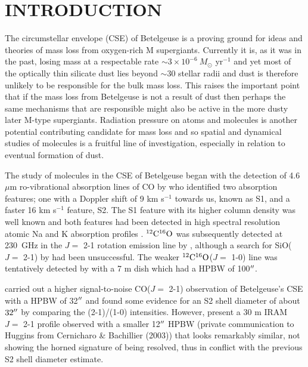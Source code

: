 \documentclass[preprint2]{aastex}
\begin{document}

\section{INTRODUCTION}

The circumstellar envelope (CSE) of Betelgeuse is a proving ground for ideas and theories of mass loss from oxygen-rich M supergiants. Currently it is, as it was in the past, losing mass at a respectable rate $\sim 3\times 10^{-6} \ M{}_{\odot}$ yr${}^{-1}$\citep{1986ApJ...306..605G, 1994ApJ...424L.127H,harper_2001} and yet most of the optically thin silicate dust lies beyond $\sim 30$ stellar radii \citep{1994AJ....107.1469D} and dust is therefore unlikely to be responsible for the bulk mass loss. This raises the important point that if the mass loss from Betelgeuse is not a result of dust then perhaps the same mechanisms that are responsible might also be active in the more dusty later M-type supergiants. Radiation pressure on atoms and molecules is another potential contributing candidate for mass loss and so spatial and dynamical studies of molecules is a fruitful line of investigation, especially in relation to eventual formation of dust.

The study of molecules in the CSE of Betelgeuse began with the detection of 4.6 $\mu$m ro-vibrational absorption lines of CO by \cite{1979ApJ...233L.135B} who identified two absorption features; one with a Doppler shift of 9 km s${}^{-1}$ towards us, known as S1, and a faster 16 km s${}^{-1}$ feature, S2. The S1 feature with its higher column density was well known \citep[e.g.][]{1962ApJ...136..844W} and both features had been detected in high spectral resolution atomic Na and K absorption profiles \citep{1975ApJ...199..427G}. $\rm{{}^{12}C^{16}O}$ was subsequently detected at 230~GHz in the $J=$ 2-1 rotation emission line by \cite{1980ApJ...242L..25K}, although a search for SiO($J=$ 2-1) by \cite{1978ApJ...221..854L} had been unsuccessful. The weaker $\rm{{}^{12}C^{16}O}$($J=$ 1-0) line was tentatively detected by \cite{1985ApJ...292..640K} with a 7 m dish which had a HPBW of 100$\mbox{$^{\prime\prime}$}$.

\cite{1987ApJ...313..400H} carried out a higher signal-to-noise CO($J=$ 2-1) observation of Betelgeuse's CSE with a  HPBW of 32$\mbox{$^{\prime\prime}$}$ and found some evidence for an S2 shell diameter of about $32\mbox{$^{\prime\prime}$}$ by comparing the  (2-1)/(1-0) intensities. However, \cite{1994ApJ...424L.127H} present a 30 m IRAM $J=$ 2-1 profile observed with a smaller 12$\mbox{$^{\prime\prime}$}$ HPBW (private communication to Huggins from Cernicharo \& Bachillier (2003)) that  looks remarkably similar, not showing the horned signature of being resolved, thus in conflict with the previous S2 shell diameter estimate.
\end{document}
